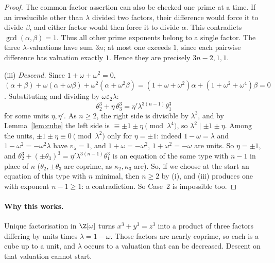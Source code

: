 \begin{proof}
The common-factor assertion can also be checked one prime at a time.
If an irreducible other than $\lambda$ divided two factors, their
difference would force it to divide $\beta$, and either factor would
then force it to divide $\alpha$. This contradicts
$\gcd(\alpha,\beta)=1$. Thus all other prime exponents belong to a
single factor. The three $\lambda$-valuations have sum $3n$;
at most one exceeds $1$, since each pairwise difference has valuation
exactly $1$. Hence they are precisely $3n-2,1,1$.

(iii) \emph{Descend.} Since $1+\omega+\omega^2=0$,
$(\alpha+\beta)+\omega(\alpha+\omega\beta)+\omega^2(\alpha+\omega^2\beta)=(1+\omega+\omega^2)\alpha+(1+\omega^2+\omega^4)\beta=0$. Substituting and dividing by $\omega\varepsilon_2\lambda$:
\[
\theta_2^3+\eta\,\theta_3^3=\eta'\lambda^{3(n-1)}\theta_1^3
\]
for some units $\eta,\eta'$. As $n\ge2$, the right side is divisible by $\lambda^3$, and by Lemma~\ref{lem:cube} the left side is $\equiv\pm1\pm\eta\pmod{\lambda^4}$, so $\lambda^2\mid\pm1\pm\eta$. Among the units, $\pm1\pm\eta\equiv0\pmod{\lambda^2}$ only for $\eta=\pm1$: indeed $1-\omega=\lambda$ and $1-\omega^2=-\omega^2\lambda$ have $v_\lambda=1$, and $1+\omega=-\omega^2$, $1+\omega^2=-\omega$ are units. So $\eta=\pm1$, and $\theta_2^3+(\pm\theta_3)^3=\eta'\lambda^{3(n-1)}\theta_1^3$ is an equation of the same type with $n-1$ in place of $n$ ($\theta_2,\pm\theta_3$ are coprime, as $\kappa_2,\kappa_3$ are). So, if we choose at the start an equation of this type with $n$ minimal, then $n\ge2$ by (i), and (iii) produces one with exponent $n-1\ge1$: a contradiction. So Case~2 is impossible too.
\end{proof}

\paragraph{Why this works.}
Unique factorisation in $\Z[\omega]$ turns $x^3+y^3=z^3$ into a product of three factors differing by units times $\lambda=1-\omega$. Those factors are nearly coprime, so each is a cube up to a unit, and $\lambda$ occurs to a valuation that can be decreased. Descent on that valuation cannot start.

